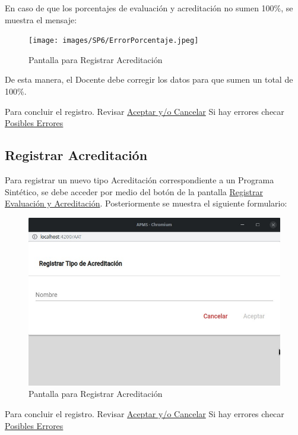 En caso de que los porcentajes de evaluación y acreditación no sumen 100\%, se muestra el mensaje:


\begin{figure}[H]
    \centering
    \hypertarget{XXX}{\texttt{[image: images/SP6/ErrorPorcentaje.jpeg]}}
    \caption{Pantalla para Registrar Acreditación}
\end{figure}

De esta manera, el Docente debe corregir los datos para que sumen un total de 100\%.

Para concluir el registro. Revisar \hyperlink{AceptarCancelar}{Aceptar y/o Cancelar}
Si hay errores checar \hyperlink{Errores}{Posibles Errores}

\pagebreak
\hypertarget{RegA}{\subsection{Registrar Acreditación}}

Para registrar un nuevo tipo Acreditación correspondiente a un Programa Sintético, se debe acceder por medio del botón  de la pantalla \hyperlink{RegEyA}{Registrar Evaluación y Acreditación}. Posteriormente se muestra el siguiente formulario: 


\begin{figure}[H]
    \centering
    \hypertarget{RegA}{\includegraphics[width=0.5\linewidth]{images/SP6/9.jpeg}}
    \caption{Pantalla para Registrar Acreditación}
\end{figure}



Para concluir el registro. Revisar \hyperlink{AceptarCancelar}{Aceptar y/o Cancelar}
Si hay errores checar \hyperlink{Errores}{Posibles Errores}